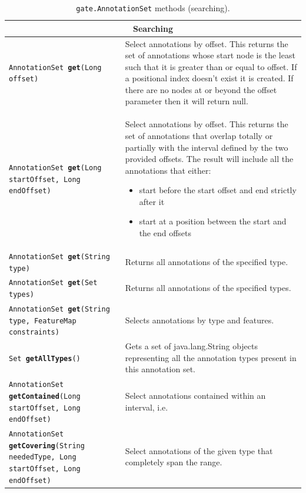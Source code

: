 \begin{table}[htbp]
\begin{center}
\begin{small}
\begin{tabular}{|p{}|p{}|}
\hline
\multicolumn{2}{|c|}{\textbf{Searching}}\\
\hline
\hline
{\tt AnnotationSet {\bf get}(Long offset)} & Select annotations by offset.
This returns the set of annotations whose start node is the least such that
it is greater than or equal to offset. If a positional index doesn't exist it
is created. If there are no nodes at or beyond the offset parameter then it
will return null.\\
\hline
{\tt AnnotationSet {\bf get}(Long startOffset, Long endOffset)} &
Select annotations by offset. This returns the set of annotations that
overlap totally or partially with the interval defined by the two provided
offsets. The result will include all the annotations that either:
\begin{itemize}
\item start before the start offset and end strictly after it
\item start at a position between the start and the end offsets
\end{itemize}\\
\hline
{\tt AnnotationSet {\bf get}(String type)} & Returns all annotations of the
specified type.\\
\hline
{\tt AnnotationSet {\bf get}(Set types)} & Returns all annotations of the
specified types.\\
\hline
{\tt AnnotationSet {\bf get}(String type, FeatureMap constraints)} & Selects
annotations by type and features.\\
\hline
{\tt Set {\bf getAllTypes}()} & Gets a set of java.lang.String objects
representing all the annotation types present in this annotation set.\\
\hline
{\tt AnnotationSet {\bf getContained}(Long startOffset, Long endOffset)} &
Select annotations contained within an interval, i.e.\\
\hline
{\tt AnnotationSet {\bf getCovering}(String neededType, Long startOffset,
Long endOffset)} &
Select annotations of the given type that completely span the range.\\
\hline
\end{tabular}
\caption{{\tt gate.AnnotationSet} methods (searching).}
\label{table:annSet2}
\end{small}
\end{center}
\end{table}

